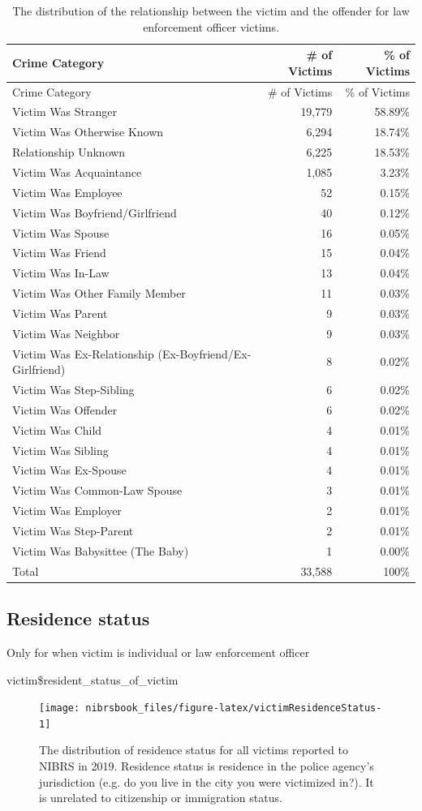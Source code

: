 \documentclass[
  12pt,
  openany]{book}
\begin{document}
\begin{longtable}[]{@{}lrr@{}}
\caption{\label{tab:victimRelationshipPolice}The distribution of the relationship between the victim and the offender for law enforcement officer victims.}\tabularnewline
\toprule
Crime Category & \# of Victims & \% of Victims\tabularnewline
\midrule
\endfirsthead
\toprule
Crime Category & \# of Victims & \% of Victims\tabularnewline
\midrule
\endhead
Victim Was Stranger & 19,779 & 58.89\%\tabularnewline
Victim Was Otherwise Known & 6,294 & 18.74\%\tabularnewline
Relationship Unknown & 6,225 & 18.53\%\tabularnewline
Victim Was Acquaintance & 1,085 & 3.23\%\tabularnewline
Victim Was Employee & 52 & 0.15\%\tabularnewline
Victim Was Boyfriend/Girlfriend & 40 & 0.12\%\tabularnewline
Victim Was Spouse & 16 & 0.05\%\tabularnewline
Victim Was Friend & 15 & 0.04\%\tabularnewline
Victim Was In-Law & 13 & 0.04\%\tabularnewline
Victim Was Other Family Member & 11 & 0.03\%\tabularnewline
Victim Was Parent & 9 & 0.03\%\tabularnewline
Victim Was Neighbor & 9 & 0.03\%\tabularnewline
Victim Was Ex-Relationship (Ex-Boyfriend/Ex-Girlfriend) & 8 & 0.02\%\tabularnewline
Victim Was Step-Sibling & 6 & 0.02\%\tabularnewline
Victim Was Offender & 6 & 0.02\%\tabularnewline
Victim Was Child & 4 & 0.01\%\tabularnewline
Victim Was Sibling & 4 & 0.01\%\tabularnewline
Victim Was Ex-Spouse & 4 & 0.01\%\tabularnewline
Victim Was Common-Law Spouse & 3 & 0.01\%\tabularnewline
Victim Was Employer & 2 & 0.01\%\tabularnewline
Victim Was Step-Parent & 2 & 0.01\%\tabularnewline
Victim Was Babysittee (The Baby) & 1 & 0.00\%\tabularnewline
Total & 33,588 & 100\%\tabularnewline
\bottomrule
\end{longtable}


\hypertarget{residence-status}{%
\subsection{Residence status}\label{residence-status}}

Only for when victim is individual or law enforcement officer

victim\$resident\_status\_of\_victim

\begin{figure}

{\centering \texttt{[image: nibrsbook\_files/figure-latex/victimResidenceStatus-1]} 

}

\caption{The distribution of residence status for all victims reported to NIBRS in 2019. Residence status is residence in the police agency's jurisdiction (e.g. do you live in the city you were victimized in?). It is unrelated to citizenship or immigration status.}\label{fig:victimResidenceStatus}
\end{figure}
\end{document}
